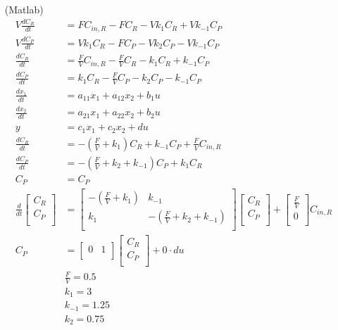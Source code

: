 \documentclass[12pt]{article}
\begin{document}
\begin{enumerate}
\begin{enumerate}
    \item[(Matlab)]
    \begin{align*}
        V \frac{dC_R}{dt} &= F C_{in,R} - F C_R - V k_1 C_R + V k_{-1} C_P \\
        V \frac{dC_P}{dt} &= V k_1 C_R - F C_P - V k_2 C_P - V k_{-1} C_P \\
        \frac{dC_R}{dt} &= \frac{F}{V} C_{in,R} - \frac{F}{V} C_R - k_1 C_R + k_{-1} C_P \\
        \frac{dC_P}{dt} &= k_1 C_R - \frac{F}{V} C_P - k_2 C_P - k_{-1} C_P \\
        \frac{dx_1}{dt} &= a_{11} x_1 + a_{12} x_2 + b_1 u \\
        \frac{dx_2}{dt} &= a_{21} x_1 + a_{22} x_2 + b_2 u \\
        y &= c_1 x_1 + c_2 x_2 + du \\
        \frac{dC_R}{dt} &= - \left(\frac{F}{V} + k_1\right) C_R + k_{-1} C_P + \frac{F}{V} C_{in,R} \\
        \frac{dC_P}{dt} &= -\left(\frac{F}{V} + k_2 + k_{-1}\right) C_P + k_1 C_R \\
        C_P &= C_P \\
        \frac{d}{dt}\begin{bmatrix}
        C_R \\
        C_P \\
        \end{bmatrix} &= \begin{bmatrix}
        - \left(\frac{F}{V} + k_1\right) & k_{-1} \\
        k_1 & -\left(\frac{F}{V} + k_2 + k_{-1}\right) \\
        \end{bmatrix} \begin{bmatrix}
        C_R \\
        C_P \\
        \end{bmatrix} + \begin{bmatrix}
        \frac{F}{V} \\
        0 \\
        \end{bmatrix} C_{in,R} \\
        C_P &= \begin{bmatrix}
        0 & 1 \\
        \end{bmatrix} \begin{bmatrix}
        C_R \\
        C_P \\
        \end{bmatrix} + 0 \cdot du \\
        & \frac{F}{V} = 0.5 \\
        & k_1 = 3 \\
        & k_{-1} = 1.25 \\
        & k_2 = 0.75
    \end{align*}


\end{enumerate}
\end{enumerate}
\end{document}
